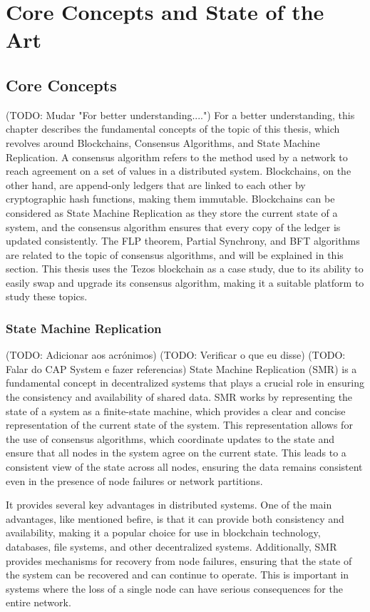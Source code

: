 \chapter{Core Concepts and State of the Art}
\section{Core Concepts}
(TODO: Mudar "For better understanding....")
For a better understanding, this chapter describes the fundamental concepts of the topic of this thesis, which revolves around Blockchains, Consensus Algorithms, and State Machine Replication. A consensus algorithm refers to the method used by a network to reach agreement on a set of values in a distributed system. Blockchains, on the other hand, are append-only ledgers that are linked to each other by cryptographic hash functions, making them immutable. Blockchains can be considered as State Machine Replication as they store the current state of a system, and the consensus algorithm ensures that every copy of the ledger is updated consistently. The FLP theorem, Partial Synchrony, and BFT algorithms are related to the topic of consensus algorithms, and will be explained in this section. This thesis uses the Tezos blockchain as a case study, due to its ability to easily swap and upgrade its consensus algorithm, making it a suitable platform to study these topics.

\subsection*{\textbf{State Machine Replication}}
(TODO: Adicionar aos acrónimos)
(TODO: Verificar o que eu disse)
(TODO: Falar do CAP System e fazer referencias)
State Machine Replication (SMR) is a fundamental concept in decentralized systems that plays a crucial role in ensuring the consistency and availability of shared data.
SMR works by representing the state of a system as a finite-state machine, which provides a clear and concise representation of the current state of the system.
This representation allows for the use of consensus algorithms, which coordinate updates to the state and ensure that all nodes in the system agree on the current state.
This leads to a consistent view of the state across all nodes, ensuring the data remains consistent even in the presence of node failures or network partitions.

It provides several key advantages in distributed systems.
One of the main advantages, like mentioned befire, is that it can provide both consistency and availability, making it a popular choice for use in blockchain technology, databases, file systems, and other decentralized systems. Additionally, SMR provides mechanisms for recovery from node failures, ensuring that the state of the system can be recovered and can continue to operate. 
This is important in systems where the loss of a single node can have serious consequences for the entire network.

